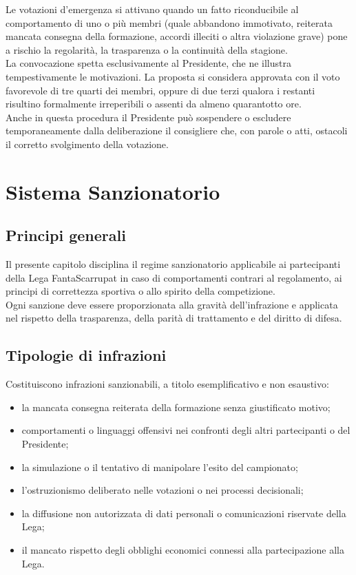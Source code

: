 Le votazioni d’emergenza si attivano quando un fatto riconducibile al comportamento di uno o più membri (quale abbandono immotivato, reiterata mancata consegna della formazione, accordi illeciti o altra violazione grave) pone a rischio la regolarità, la trasparenza o la continuità della stagione.\\

La convocazione spetta esclusivamente al Presidente, che ne illustra tempestivamente le motivazioni. La proposta si considera approvata con il voto favorevole di tre quarti dei membri, oppure di due terzi qualora i restanti risultino formalmente irreperibili o assenti da almeno quarantotto ore.\\

Anche in questa procedura il Presidente può sospendere o escludere temporaneamente dalla deliberazione il consigliere che, con parole o atti, ostacoli il corretto svolgimento della votazione.


\chapter{Sistema Sanzionatorio}
\label{cap:sistema-sanzionatorio}

\section{Principi generali}
\label{art:3.1}

Il presente capitolo disciplina il regime sanzionatorio applicabile ai partecipanti della Lega FantaScarrupat in caso di comportamenti contrari al regolamento, ai principi di correttezza sportiva o allo spirito della competizione.\\
Ogni sanzione deve essere proporzionata alla gravità dell’infrazione e applicata nel rispetto della trasparenza, della parità di trattamento e del diritto di difesa.

\section{Tipologie di infrazioni}
\label{art:3.2}

\noindent
Costituiscono infrazioni sanzionabili, a titolo esemplificativo e non esaustivo:
\begin{itemize}
  \item la mancata consegna reiterata della formazione senza giustificato motivo;
  \item comportamenti o linguaggi offensivi nei confronti degli altri partecipanti o del Presidente;
  \item la simulazione o il tentativo di manipolare l’esito del campionato;
  \item l’ostruzionismo deliberato nelle votazioni o nei processi decisionali;
  \item la diffusione non autorizzata di dati personali o comunicazioni riservate della Lega;
  \item il mancato rispetto degli obblighi economici connessi alla partecipazione alla Lega.
\end{itemize}

